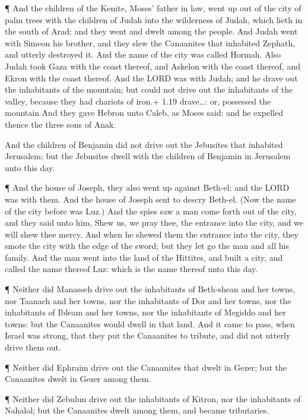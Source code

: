  ¶ And the children of the Kenite, Moses' father in law,
went up out of the city of palm trees with the children of Judah into
the wilderness of Judah, which lieth in the south of Arad; and they went
and dwelt among the people.  And Judah went with Simeon his
brother, and they slew the Canaanites that inhabited Zephath, and
utterly destroyed it. And the name of the city was called Hormah.
 Also Judah took Gaza with the coast thereof, and Askelon
with the coast thereof, and Ekron with the coast thereof. 
And the LORD was with Judah; and he drave out the inhabitants of the
mountain; but could not drive out the inhabitants of the valley, because
they had chariots of iron.+ 1.19 drave\ldots: or, possessed the mountain
 And they gave Hebron unto Caleb, as Moses said: and he
expelled thence the three sons of Anak.

 And the children of Benjamin did not drive out the
Jebusites that inhabited Jerusalem; but the Jebusites dwell with the
children of Benjamin in Jerusalem unto this day.

 ¶ And the house of Joseph, they also went up against
Beth-el: and the LORD was with them.  And the house of
Joseph sent to descry Beth-el. (Now the name of the city before was
Luz.)  And the spies saw a man come forth out of the city,
and they said unto him, Shew us, we pray thee, the entrance into the
city, and we will shew thee mercy.  And when he shewed them
the entrance into the city, they smote the city with the edge of the
sword; but they let go the man and all his family.  And the
man went into the land of the Hittites, and built a city, and called the
name thereof Luz: which is the name thereof unto this day.

 ¶ Neither did Manasseh drive out the inhabitants of
Beth-shean and her towns, nor Taanach and her towns, nor the inhabitants
of Dor and her towns, nor the inhabitants of Ibleam and her towns, nor
the inhabitants of Megiddo and her towns: but the Canaanites would dwell
in that land.  And it came to pass, when Israel was strong,
that they put the Canaanites to tribute, and did not utterly drive them
out.

 ¶ Neither did Ephraim drive out the Canaanites that dwelt
in Gezer; but the Canaanites dwelt in Gezer among them.

 ¶ Neither did Zebulun drive out the inhabitants of Kitron,
nor the inhabitants of Nahalol; but the Canaanites dwelt among them, and
became tributaries.

